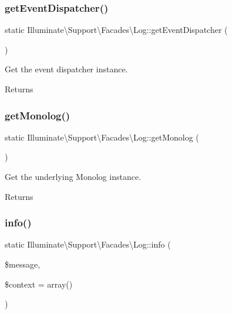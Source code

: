 \subsubsection{\texorpdfstring{get\+Event\+Dispatcher()}{getEventDispatcher()}}
{\footnotesize\ttfamily static Illuminate\textbackslash{}\+Support\textbackslash{}\+Facades\textbackslash{}\+Log\+::get\+Event\+Dispatcher (\begin{DoxyParamCaption}{ }\end{DoxyParamCaption})\hspace{0.3cm}{\ttfamily [static]}}

Get the event dispatcher instance.

\begin{DoxyReturn}{Returns}

\end{DoxyReturn}
\mbox{\label{class_illuminate_1_1_support_1_1_facades_1_1_log_a0c00c7c59ce5ce04e3ed5f29e17788ab}} 
\subsubsection{\texorpdfstring{get\+Monolog()}{getMonolog()}}
{\footnotesize\ttfamily static Illuminate\textbackslash{}\+Support\textbackslash{}\+Facades\textbackslash{}\+Log\+::get\+Monolog (\begin{DoxyParamCaption}{ }\end{DoxyParamCaption})\hspace{0.3cm}{\ttfamily [static]}}

Get the underlying Monolog instance.

\begin{DoxyReturn}{Returns}

\end{DoxyReturn}
\mbox{\label{class_illuminate_1_1_support_1_1_facades_1_1_log_acbbeebd340cccb5b259b123086d962d3}} 
\subsubsection{\texorpdfstring{info()}{info()}}
{\footnotesize\ttfamily static Illuminate\textbackslash{}\+Support\textbackslash{}\+Facades\textbackslash{}\+Log\+::info (\begin{DoxyParamCaption}\item[{}]{\$message,  }\item[{}]{\$context = {\ttfamily array()} }\end{DoxyParamCaption})\hspace{0.3cm}{\ttfamily [static]}}

